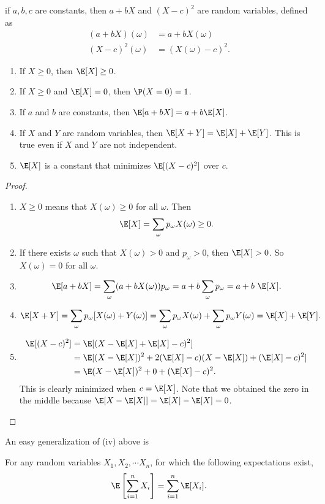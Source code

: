 \documentclass[a4paper]{article}
\begin{document}
\begin{eg}
  if $a, b, c$ are constants, then $a + bX$ and $(X - c)^2$ are random variables, defined as
  \begin{align*}
    (a + bX)(\omega) &= a + bX(\omega)\\
    (X - c)^2(\omega) &= (X(\omega) - c)^2.
  \end{align*}
\end{eg}

\begin{thm}\leavevmode
\begin{enumerate}
  \item If $X \geq 0$, then $\E[X] \geq 0$.
  \item If $X\geq 0$ and $\E[X] = 0$, then $\P(X = 0) = 1$.
  \item If $a$ and $b$ are constants, then $\E[a + bX] = a + b\E[X]$.
  \item If $X$ and $Y$ are random variables, then $\E[X + Y] = \E[X] + \E[Y]$. This is true even if $X$ and $Y$ are not independent.
  \item $\E[X]$ is a constant that minimizes $\E[(X - c)^2]$ over $c$.
\end{enumerate}
\end{thm}
\begin{proof}\leavevmode
  \begin{enumerate}
    \item $X \geq 0$ means that $X(\omega) \geq 0$ for all $\omega$. Then
      \[
        \E[X] = \sum_\omega p_\omega X(\omega) \geq 0.
      \]
    \item If there exists $\omega$ such that $X(\omega) > 0$ and $p_\omega > 0$, then $\E[X] > 0$. So $X(\omega) = 0$ for all $\omega$.
    \item
      \[
        \E[a + bX] = \sum_\omega (a + bX(\omega))p_\omega = a + b\sum_\omega p_\omega= a + b\ \E[X].
      \]
    \item
      \[ \E[X + Y] = \sum_\omega p_\omega[X(\omega) + Y(\omega)] = \sum_\omega p_\omega X(\omega) + \sum_\omega p_\omega Y(\omega) = \E[X] + \E[Y].
      \]
    \item
      \begin{align*}
        \E[(X - c)^2] &= \E[(X - \E[X] + \E[X] - c)^2]\\
        &= \E[(X - \E[X])^2 + 2(\E[X] - c)(X - \E[X]) + (\E[X] - c)^2]\\
        &= \E(X - \E[X])^2 + 0 + (\E[X] - c)^2.
      \end{align*}
      This is clearly minimized when $c = \E[X]$. Note that we obtained the zero in the middle because $\E[X - \E[X]] = \E[X] - \E[X] = 0$.
  \end{enumerate}
\end{proof}
An easy generalization of (iv) above is
\begin{thm}
  For any random variables $X_1, X_2, \cdots X_n$, for which the following expectations exist,
  \[
    \E\left[\sum_{i = 1}^n X_i\right] = \sum_{i = 1}^n \E[X_i].
  \]
\end{thm}
\end{document}

